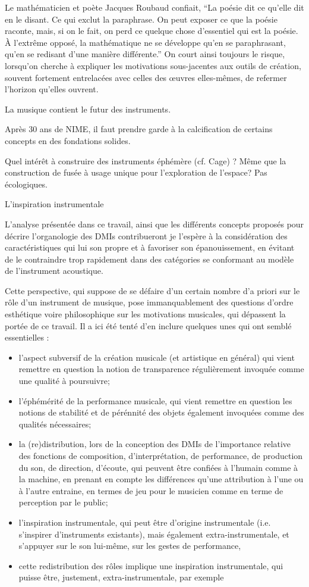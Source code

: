 Le mathématicien et poète Jacques Roubaud confiait, ``La poésie dit ce qu’elle dit en le disant. Ce qui exclut la paraphrase. On peut exposer ce que la poésie raconte, mais, si on le fait, on perd ce quelque chose d’essentiel qui est la poésie. À l’extrême opposé, la mathématique ne se développe qu’en se paraphrasant, qu’en se redisant d’une manière différente.''
On court ainsi toujours le risque, lorsqu'on cherche à expliquer les motivations sous-jacentes aux outils de création, souvent fortement entrelacées avec celles des œuvres elles-mêmes, de refermer l'horizon qu'elles ouvrent.

La musique contient le futur des instruments.


Après 30 ans de NIME, il faut prendre garde à la calcification de certains concepts en des fondations solides. 

Quel intérêt à construire des instruments éphémère (cf. Cage) ?
Même que la construction de fusée à usage unique pour l'exploration de l'espace?
Pas écologiques.

L'inspiration instrumentale

L'analyse présentée dans ce travail, ainsi que les différents concepts proposés pour décrire l'organologie des \glspl{DMI} contribueront je l'espère à la considération des caractéristiques qui lui son propre et à favoriser son épanouissement, en évitant de le contraindre trop rapidement dans des catégories se conformant au modèle de l'instrument acoustique. 

Cette perspective, qui suppose de se défaire d'un certain nombre d'a priori sur le rôle d'un instrument de musique, pose immanquablement des questions d'ordre esthétique voire philosophique sur les motivations musicales, qui dépassent la portée de ce travail. Il a ici été tenté d'en inclure quelques unes qui ont semblé essentielles : 
\begin{itemize}[noitemsep]
	\item l'aspect subversif de la création musicale (et artistique en général) qui vient remettre en question la notion de transparence régulièrement invoquée comme une qualité à poursuivre;
	\item l'éphémérité de la performance musicale, qui vient remettre en question les notions de stabilité et de pérénnité des objets également invoquées comme des qualités nécessaires;
	\item la (re)distribution, lors de la conception des \glspl{DMI} de l'importance relative des fonctions de composition, d'interprétation, de performance, de production du son, de direction, d'écoute, qui peuvent être confiées à l'humain comme à la machine, en prenant en compte les différences qu'une attribution à l'une ou à l'autre entraine, en termes de jeu pour le musicien comme en terme de perception par le public;
	\item l'inspiration instrumentale, qui peut être d'origine instrumentale (i.e. s'inspirer d'instruments existants), mais également extra-instrumentale, et s'appuyer sur le son lui-même, sur les gestes de performance,
	\item cette redistribution des rôles implique une inspiration instrumentale, qui puisse être, justement, extra-instrumentale, par exemple
\end{itemize}


